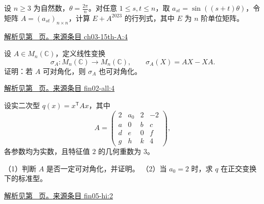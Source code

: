 \documentclass[12pt,fontset=fandol]{ctexart}
\begin{document}
\begin{example}\label{ex:ch03-15th-A:4}

设 $n \geq 3$ 为自然数，$\theta = \frac{2\pi}{n}$。对任意 $1 \leq s,t \leq n$，取 $a_{st} = \sin((s+t)\theta)$，令矩阵 $A = \left(a_{st}\right)_{n \times n}$，计算 $E + A^{2023}$ 的行列式，其中 $E$ 为 $n$ 阶单位矩阵。

\par\hyperref[ans:ch03-15th-A:4]{解析见第~\pageref{ans:ch03-15th-A:4} 页。}\quad\href{https://github.com/lzxcr/cmc-mathematics/blob/64916fa1fdbc3e444a652eca204d5669058ee321/src/problems/preliminary/15/04.md}{来源条目 ch03-15th-A:4}

\end{example}

\begin{example}\label{ex:fin02-all:4}

设 $A\in M_n(\mathbb C)$，定义线性变换
\[
\sigma_A:M_n(\mathbb C)\to M_n(\mathbb C),\qquad
\sigma_A(X)=AX-XA.
\]
证明：若 $A$ 可对角化，则 $\sigma_A$ 也可对角化。

\par\hyperref[ans:fin02-all:4]{解析见第~\pageref{ans:fin02-all:4} 页。}\quad\href{https://github.com/lzxcr/cmc-mathematics/blob/64916fa1fdbc3e444a652eca204d5669058ee321/src/problems/finals/02/04.md}{来源条目 fin02-all:4}

\end{example}

\begin{example}\label{ex:fin05-hi:2}

设实二次型 $q(x)=x^{\mathsf T}Ax$，其中
\[
A=\begin{pmatrix}
2&a_0&2&-2\\
a&0&b&c\\
d&e&0&f\\
g&h&k&4
\end{pmatrix},
\]
各参数均为实数，且特征值 $2$ 的几何重数为 $3$。

（1）判断 $A$ 是否一定可对角化，并证明。
（2）当 $a_0=2$ 时，求 $q$ 在正交变换下的标准型。

\par\hyperref[ans:fin05-hi:2]{解析见第~\pageref{ans:fin05-hi:2} 页。}\quad\href{https://github.com/lzxcr/cmc-mathematics/blob/64916fa1fdbc3e444a652eca204d5669058ee321/src/problems/finals/05/02.md}{来源条目 fin05-hi:2}

\end{example}
\end{document}
